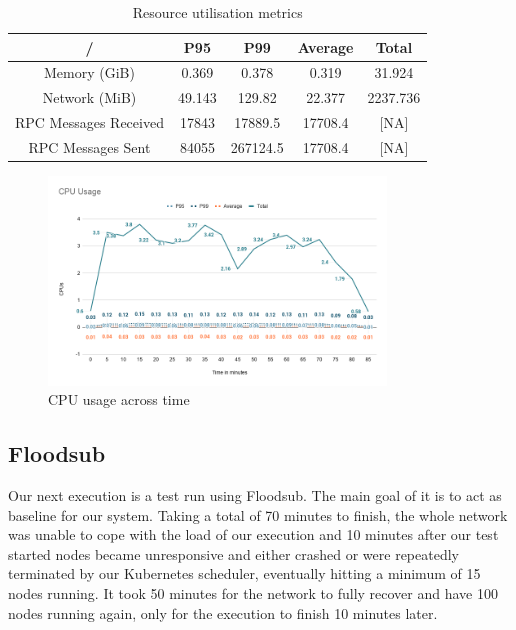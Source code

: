 \begin{table}[!htb]
\caption{Resource utilisation metrics}
\label{table:pulsarcast}
  \begin{center}
   \begin{tabular}{|c| c c c c|} 
   \hline
   / & P95 & P99 & Average & Total \\ [0.5ex] 
   \hline\hline
   Memory (GiB) & 0.369 & 0.378 & 0.319 & 31.924 \\
   \hline
   Network (MiB) & 49.143 & 129.82 & 22.377 & 2237.736 \\
   \hline
   RPC Messages Received & 17843 & 17889.5 & 17708.4 & [NA] \\
   \hline
   RPC Messages Sent & 84055 & 267124.5 & 17708.4 & [NA] \\ [1ex] 
   \hline
  \end{tabular}
  \end{center}
\end{table}

\begin{figure}[!htb]
  \centering
  \includegraphics[width=0.8\textwidth]{img/graph-pulsarcast-cpu.png}
  \caption{CPU usage across time}
  \label{fig:graph-pulsarcast-cpu}
\end{figure}

\subsection{Floodsub}\label{subsec:floodsub}

Our next execution is a test run using Floodsub. The main goal of it is to act
as baseline for our system. Taking a total of 70 minutes to finish, the whole
network was unable to cope with the load of our execution and 10 minutes after
our test started nodes became unresponsive and either crashed or were
repeatedly terminated by our Kubernetes scheduler, eventually hitting a minimum
of 15 nodes running. It took 50 minutes for the network to fully recover and
have 100 nodes running again, only for the execution to finish 10 minutes
later.

